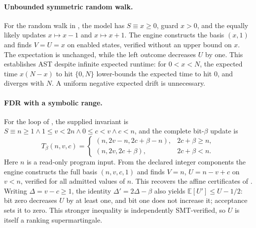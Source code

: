 \paragraph{Unbounded symmetric random walk.}
For the random walk in , the model has $S\equiv x\geq0$, guard
$x>0$, and the equally likely updates $x\mapsto x-1$ and $x\mapsto x+1$.
The engine constructs the basis $(x,1)$ and finds $V=U=x$ on enabled
states, verified without an upper bound on $x$. The expectation is
unchanged, while the left outcome decreases $U$ by one.
This establishes AST despite infinite expected runtime:
for $0<x<N$, the expected time $x(N-x)$ to hit $\{0,N\}$ lower-bounds
the expected time to hit $0$, and diverges with $N$.
A uniform negative expected drift is unnecessary.

\paragraph{FDR with a symbolic range.}
For the loop of , the supplied invariant is
$S\equiv n\geq1\land1\leq v<2n\land0\leq c<v\land c<n$, and the
complete bit-$\beta$ update is
\[
 T_\beta(n,v,c)=
 \begin{cases}
 (n,2v-n,2c+\beta-n),&2c+\beta\geq n,\\
 (n,2v,2c+\beta),&2c+\beta<n.
 \end{cases}
\]
Here $n$ is a read-only program input. From the declared integer
components the engine constructs the full basis $(n,v,c,1)$ and finds
$V=n$, $U=n-v+c$ on $v<n$, verified for all admitted values of $n$.
This recovers the affine certificates of .
Writing $\Delta=v-c\geq1$, the identity $\Delta'=2\Delta-\beta$
also yields $\mathbb E[U']\leq U-1/2$: bit zero decreases $U$ by
at least one, and bit one does not increase it; acceptance sets it to zero.
This stronger inequality is independently SMT-verified, so $U$ is itself
a ranking supermartingale.

